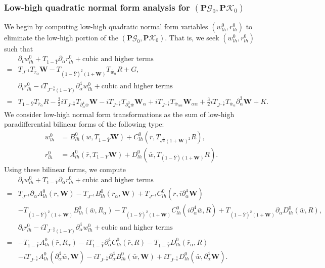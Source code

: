 \documentclass[10pt]{amsart}
\theoremstyle{remark}
\theoremstyle{definition}
\numberwithin{equation}{section}
\newcommand{\p}{\partial}
\newcommand{\al}{\alpha}
\newcommand{\f}{\frac}
\newcommand{\bw}{\mathbf{W}}
\newcommand{\nP}{{\mathbf P}}
\begin{document}
\subsubsection{Low-high quadratic normal form analysis for $(\nP\mathcal{G}_0, \nP\mathcal{K}_0)$} 
We begin by computing low-high quadratic normal form variables $(w^0_{lh}, r^0_{lh})$ to eliminate the low-high portion of the $(\nP\mathcal{G}_0, \nP\mathcal{K}_0)$.
That is, we seek $(w^0_{lh}, r^0_{lh})$ such that
\begin{align*}
 &\p_tw^0_{lh}+T_{1-\bar{Y}}\p_\al r^0_{lh} + \text{cubic and higher terms}\\
 =&  T_{J^{-1}}T_{\bar{r}_\alpha}\bw -  T_{(1-\bar{Y})^2(1+\bw)}T_{\bar{w}_\alpha} R  + G,\\
&\p_tr^0_{lh}-iT_{J^{-\frac{3}{2}}(1-Y)}\p_\al^4w^0_{lh} + \text{cubic and higher terms}\\
=&T_{1-\bar{Y}}T_{\bar{r}_\alpha} R  -\f32 i T_{J^{-\f52}} T_{\p^4_{\al}\bar{w}}\bw - iT_{J^{-\f52}}T_{\p^3_{\al}\bar{w}}\bw_\al +iT_{J^{-\f52}} T_{\bar{w}_{\al\al}}\bw_{\al\al}+ \f32iT_{J^{-\f52}}T_{\bar{w}_{\al}} \p^3_{\al}\bw +K.   
\end{align*}
We consider low-high normal form transformations as the sum of low-high paradifferential bilinear forms of the following type:
\begin{equation*} %
\begin{aligned}
w^0_{lh} &= B^0_{lh}\left(\bar{w}, T_{1-\bar{Y}}\bw \right) + C^0_{lh}\left(\bar{r}, T_{J^{\frac{1}{2}}(1+\bw)^2}R \right),\\
r^0_{lh} &= A^0_{lh} \left(\bar{r}, T_{1-Y}\bw \right) + D^0_{lh}\left(\bar{w}, T_{(1-\bar{Y})(1+\bw)}R\right).
\end{aligned}
\end{equation*}
Using these bilinear forms, we compute
\begin{align*}
&\partial_t w^0_{lh}+T_{1-\bar{Y}} \partial_\alpha r^0_{lh} + \text{cubic and higher terms} \\
=& T_{J^{-1}}\partial_\alpha A^0_{lh}(\bar{r}, \bw) -T_{J^{-1}}B^0_{lh}(\bar{r}_\alpha, \bw) +  T_{J^{-1}}C^0_{lh}(\bar{r}, i\p_\al^4\bw) \\
 &-T_{(1-\bar{Y})^2(1+\bw)}B^0_{lh}(\bar{w}, R_\alpha)- T_{(1-\bar{Y})^2(1+\bw)}C^0_{lh}(i\p_\al^4\bar{w}, R) + T_{(1-\bar{Y})^2(1+\bw)}\partial_\alpha D^0_{lh}(\bar{w}, R),\\
&\partial_t r^0_{lh}  -iT_{J^{-\frac{3}{2}}(1-Y)}\p_\al^4 w^0_{lh}+ \text{cubic and higher  terms} \\
=& -T_{1-\bar{Y}}A^0_{lh}(\bar{r}, R_\alpha) - iT_{1-\bar{Y}}\partial_\alpha^4 C^0_{lh}(\bar{r}, R) - T_{1-\bar{Y}}D^0_{lh}(\bar{r}_\alpha, R)\\
&- iT_{J^{-\frac{5}{2}}}A^0_{lh}(\p_\al^4\bar{w}, \bw) -iT_{J^{-\frac{5}{2}}}\partial_\alpha^4 B^0_{lh}(\bar{w}, \bw) +iT_{J^{-\frac{5}{2}}}D^0_{lh}(\bar{w}, \p_\al^4\bw).
\end{align*}
\end{document}
